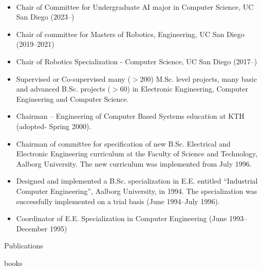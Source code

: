 \documentclass{article}
\begin{document}
\begin{cv}
\begin{cvlist}{~}
\item[Other Teaching Activities]
\begin{itemize}
  \item Chair of Committee for Undergraduate AI major in Computer Science, UC San
        Diego (2023--)
  \item Chair of committee for Masters of Robotics, Engineering, 
    UC San Diego (2019--2021)

  \item Chair of Robotics Specialization - Computer Science, UC San
    Diego (2017--)

  \item Supervised or Co-supervised many ($>$200) M.Sc. level projects,
    many basic and advanced B.Sc. projects ($>$60) in Electronic
    Engineering, Computer Engineering and Computer Science.

  \item Chairman -- Engineering of Computer Based Systems education at
    KTH (adopted- Spring 2000).

  \item Chairman of committee for specification of new B.Sc. Electrical
    and Electronic Engineering curriculum at the Faculty of Science and
    Technology, Aalborg University.  The new curriculum was implemented
    from July 1996.

  \item Designed and implemented a B.Sc. specialization in E.E.
    entitled ``Industrial Computer Engineering'', Aalborg University, in
    1994.  The specialization was successfully implemented on a trial
    basis (June 1994--July 1996).

  \item Coordinator of E.E. Specialization in Computer Engineering (June
    1993--December 1995)
\end{itemize}
\end{cvlist}



\begin{cvlist}{Publications}
\item[Books]
  \begin{btSect}{books}
    \btPrintAll
  \end{btSect}


\end{cvlist}
\end{cv}
\end{document}
